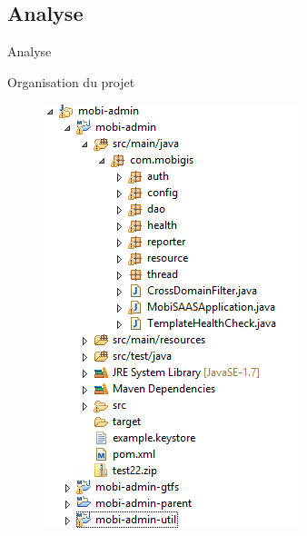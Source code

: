 \documentclass[utf8,compress]{beamer}
\begin{document}
\subsection{Analyse}
\begin{frame}{Analyse}
\begin{block}{Organisation du projet}
\begin{figure}[h]
    \center
    \includegraphics[scale=0.6]{images/Package_explorer_MobiSAAS.PNG}
\end{figure}
\end{block}
\end{frame}
\end{document}
